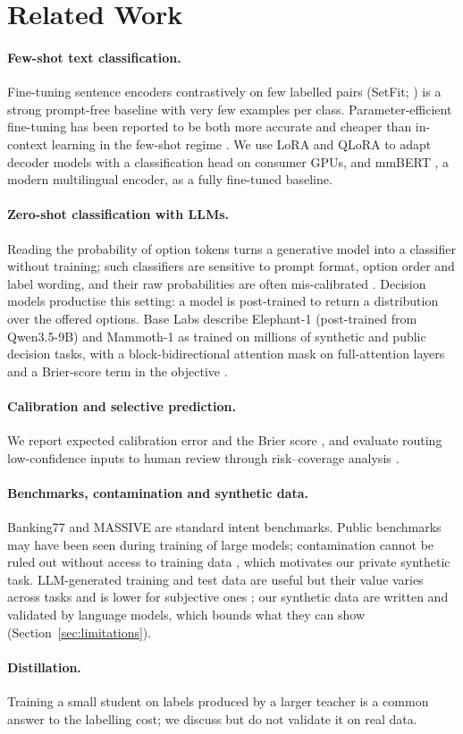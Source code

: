 \section{Related Work}

\paragraph{Few-shot text classification.} Fine-tuning sentence encoders contrastively on few labelled pairs (SetFit;
\citealp{tunstall2022setfit}) is a strong prompt-free baseline with very few examples per class. Parameter-efficient fine-tuning
has been reported to be both more accurate and cheaper than in-context learning in the few-shot regime \citep{liu2022tfew}.
We use LoRA \citep{hu2022lora} and QLoRA \citep{dettmers2023qlora} to adapt decoder models with a classification head on consumer GPUs,
and mmBERT \citep{marone2026mmbert}, a modern multilingual encoder, as a fully fine-tuned baseline.

\paragraph{Zero-shot classification with LLMs.} Reading the probability of option tokens turns a generative model into a classifier
without training; such classifiers are sensitive to prompt format, option order and label wording, and their raw probabilities are
often mis-calibrated \citep{zhao2021calibrate}. Decision models productise this setting: a model is post-trained to return a
distribution over the offered options. Base Labs describe Elephant-1 (post-trained from Qwen3.5-9B) and Mammoth-1 as trained on
millions of synthetic and public decision tasks, with a block-bidirectional attention mask on full-attention layers and a
Brier-score term in the objective \citep{baselabs2026decision,elephant1card}.

\paragraph{Calibration and selective prediction.} We report expected calibration error \citep{guo2017calibration} and the Brier score
\citep{brier1950}, and evaluate routing low-confidence inputs to human review through risk--coverage analysis
\citep{geifman2017selective}.

\paragraph{Benchmarks, contamination and synthetic data.} Banking77 \citep{casanueva2020banking77} and MASSIVE \citep{fitzgerald2022massive}
are standard intent benchmarks. Public benchmarks may have been seen during training of large models; contamination cannot be
ruled out without access to training data \citep{sainz2023contamination}, which motivates our private synthetic task. LLM-generated
training and test data are useful but their value varies across tasks and is lower for subjective ones \citep{li2023synthetic};
our synthetic data are written and validated by language models, which bounds what they can show (Section~\ref{sec:limitations}).

\paragraph{Distillation.} Training a small student on labels produced by a larger teacher \citep{hinton2015distilling} is a common
answer to the labelling cost; we discuss but do not validate it on real data.
